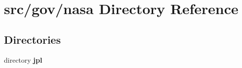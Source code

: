 \section{src/gov/nasa Directory Reference}
\label{dir_df6c5a869429dbeab6a540d4aff3f97a}
\subsection*{Directories}
\begin{DoxyCompactItemize}
\item 
directory {\bf jpl}
\end{DoxyCompactItemize}
